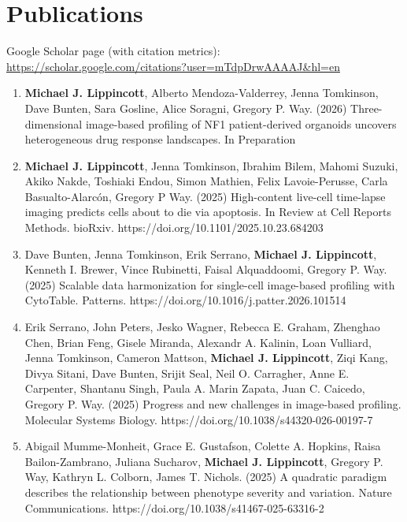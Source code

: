 \documentclass[10.5pt,letterpaper]{article}
\begin{document}
\section{Publications}
  {\small\color{muted} Google Scholar page (with citation metrics): \href{https://scholar.google.com/citations?user=mTdpDrwAAAAJ&hl=en}{https://scholar.google.com/citations?user=mTdpDrwAAAAJ\&hl=en}}\\[4pt]
    \begin{enumerate}[label=\arabic*.,leftmargin=1.6em,itemsep=5pt,topsep=3pt]
    \item {\textbf{Michael J. Lippincott}, Alberto Mendoza-Valderrey, Jenna Tomkinson, Dave Bunten, Sara Gosline, Alice Soragni, Gregory P. Way. (2026) Three-dimensional image-based profiling of NF1 patient-derived organoids uncovers heterogeneous drug response landscapes. In Preparation }
    \item {\textbf{Michael J. Lippincott}, Jenna Tomkinson, Ibrahim Bilem, Mahomi Suzuki, Akiko Nakde, Toshiaki Endou, Simon Mathien, Felix Lavoie-Perusse, Carla Basualto-Alarcón, Gregory P Way. (2025) High-content live-cell time-lapse imaging predicts cells about to die via apoptosis. In Review at Cell Reports Methods. bioRxiv. https://doi.org/10.1101/2025.10.23.684203 }
    \item {Dave Bunten, Jenna Tomkinson, Erik Serrano, \textbf{Michael J. Lippincott}, Kenneth I. Brewer, Vince Rubinetti, Faisal Alquaddoomi, Gregory P. Way. (2025) Scalable data harmonization for single-cell image-based profiling with CytoTable. Patterns. https://doi.org/10.1016/j.patter.2026.101514 }
    \item {Erik Serrano, John Peters, Jesko Wagner, Rebecca E. Graham, Zhenghao Chen, Brian Feng, Gisele Miranda, Alexandr A. Kalinin, Loan Vulliard, Jenna Tomkinson, Cameron Mattson, \textbf{Michael J. Lippincott}, Ziqi Kang, Divya Sitani, Dave Bunten, Srijit Seal, Neil O. Carragher, Anne E. Carpenter, Shantanu Singh, Paula A. Marin Zapata, Juan C. Caicedo, Gregory P. Way. (2025) Progress and new challenges in image-based profiling. Molecular Systems Biology. https://doi.org/10.1038/s44320-026-00197-7 }
    \item {Abigail Mumme-Monheit, Grace E. Gustafson, Colette A. Hopkins, Raisa Bailon-Zambrano, Juliana Sucharov, \textbf{Michael J. Lippincott}, Gregory P. Way, Kathryn L. Colborn, James T. Nichols. (2025) A quadratic paradigm describes the relationship between phenotype severity and variation. Nature Communications. https://doi.org/10.1038/s41467-025-63316-2 }

\end{enumerate}
\end{document}

